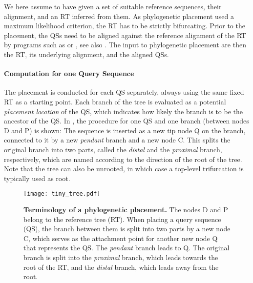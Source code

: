 We here assume to have given a set of suitable reference sequences, their alignment, and an \ac{RT} inferred from them.
As phylogenetic placement used a maximum likelihood criterion, the \ac{RT} has to be strictly bifurcating.
Prior to the placement, the \acp{QS} need to be aligned against the reference alignment of the \ac{RT}
by programs such as  \cite{Berger2011a,Berger2012} or  \cite{Eddy1998,Eddy2009},
see also .
The input to phylogenetic placement are then the \acf{RT}, its underlying alignment, and the aligned \acfp{QS}.

\paragraph{Computation for one Query Sequence}
\label{ch:Foundations:sec:PhylogeneticPlacement:sub:PipelineAndComputation:par:ComputingQuerySequence}


The placement is conducted for each \ac{QS} separately, always using the same fixed \ac{RT} as a starting point.
Each branch of the tree is evaluated as a potential \emph{placement location} of the \ac{QS},
which indicates how likely the branch is to be the ancestor of the \ac{QS}.
In ,
the procedure for one \ac{QS} and one branch (between nodes {\sffamily D} and {\sffamily P}) is shown:
The sequence is inserted as a new tip node {\sffamily Q} on the branch,
connected to it by a new \emph{pendant} branch and a new node {\sffamily C}.
This splits the original branch into two parts, called the \emph{distal} and the \emph{proximal} branch, respectively,
which are named according to the direction of the root of the tree.
Note that the tree can also be unrooted, in which case a top-level trifurcation is typically used as root.

\begin{figure}[pthb]
    \centering
    \texttt{[image: tiny\_tree.pdf]}
    \caption[Terminology of a phylogenetic placement]{
        \textbf{Terminology of a phylogenetic placement.}
        The nodes {\sffamily D} and {\sffamily P} belong to the reference tree (RT).
        When placing a query sequence (QS), the branch between them %
        is split into two parts by a new node {\sffamily C},
        which serves as the attachment point for another new node {\sffamily Q} that represents the QS.
        The \emph{pendant} branch leads to {\sffamily Q}.
        The original branch is split into the \emph{proximal} branch, which leads towards the root of the RT,
        and the \emph{distal} branch, which leads away from the root.
    }
    \label{fig:tiny_tree}
\end{figure}

